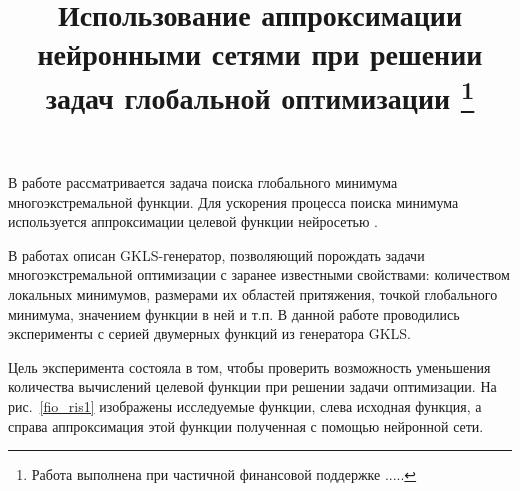 \documentclass[11pt, oneside, a4paper]{article}
\begin{document}
\setcounter{page}{1}



\title{Использование аппроксимации нейронными сетями при решении задач глобальной оптимизации \footnote{Работа выполнена при частичной финансовой поддержке .....}}





В работе рассматривается задача поиска глобального минимума многоэкстремальной функции. Для ускорения процесса поиска минимума используется аппроксимации целевой функции нейросетью \cite{fio_bib1,fio_bib2,fio_bib3,fio_bib4}.


В работах \cite{fio_bib5,fio_bib6} описан GKLS-генератор, позволяющий порождать задачи многоэкстремальной оптимизации с заранее известными свойствами: количеством локальных минимумов, размерами их областей притяжения, точкой глобального минимума, значением функции в ней и т.п. В данной работе проводились эксперименты с серией двумерных функций из генератора GKLS.


Цель эксперимента состояла в том, чтобы проверить возможность уменьшения количества вычислений целевой функции при решении задачи оптимизации. На рис.~\ref{fio_ris1} изображены исследуемые функции, слева исходная функция, а справа аппроксимация этой функции полученная с помощью нейронной сети. 
\end{document}
